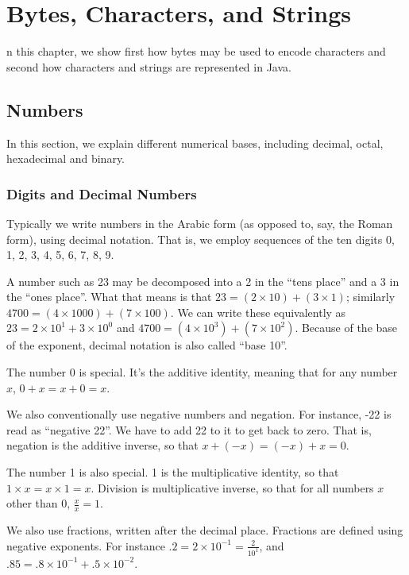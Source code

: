 \chapter{Bytes, Characters, and Strings}\label{chap:char}


n this chapter, we show first how bytes may be used
to encode characters and second how characters and strings are
represented in Java.

\section{Numbers}

In this section, we explain different numerical bases, including
decimal, octal, hexadecimal and binary.  

\subsection{Digits and Decimal Numbers}

Typically we write numbers in the Arabic form (as opposed to, say, the
Roman form), using decimal notation.  That is, we employ sequences of the
ten digits 0, 1, 2, 3, 4, 5, 6, 7, 8, 9.  

A number such as 23 may be decomposed into a 2 in the ``tens place''
and a 3 in the ``ones place''.  What that means is that $23 = (2 \times
10) + (3 \times 1)$; similarly $4700 = (4 \times 1000) + (7 \times
100)$.  We can write these equivalently as $23 = 2 \times 10^1 + 3 \times 10^0$
and $4700 = (4 \times 10^3) + (7 \times 10^2)$.  Because of the base
of the exponent, decimal notation is also called ``base 10''.

The number 0 is special.  It's the additive identity, meaning
that for any number $x$, $0 + x = x + 0 = x$.  

We also conventionally use negative numbers and negation.  For
instance, -22 is read as ``negative 22''.  We have to add 22 to it to
get back to zero.  That is, negation is the additive inverse, so that
$x + (-x) = (-x) + x = 0$.

The number 1 is also special.  1 is the multiplicative identity,
so that $1 \times x = x \times 1 = x$.  Division is multiplicative
inverse, so that for all numbers $x$ other than 0, $\frac{x}{x} = 1$.

We also use fractions, written after the decimal place.  Fractions are
defined using negative exponents.  For instance $.2 = 2 \times 10^{-1}
= \frac{2}{10^1}$, and $.85 = .8 \times 10^{-1} + .5 \times 10^{-2}$.

